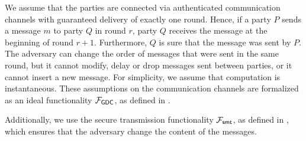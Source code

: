 We assume that the parties are connected via authenticated communication channels with guaranteed 
delivery of exactly one round. Hence, if a party $P$ sends a message $m$ to party $Q$ in round 
$r$, party $Q$ receives the message at the beginning of round $r + 1$. Furthermore, $Q$ is sure 
that the message was sent by $P$. The adversary can change the order of messages that were sent 
in the same round, but it cannot modify, delay or drop messages sent between parties, or it 
cannot insert a new message. For simplicity, we assume that computation is instantaneous. These 
assumptions on the communication channels are formalized as an ideal functionality 
$\mathcal{F}_{\mathsf{GDC}}$, as defined in \cite{mpvsc}.

Additionally, we use the secure transmission functionality $\mathcal{F}_{\mathsf{smt}}$, as defined in 
\cite{canetti}, which ensures that the adversary change the content of the messages.



